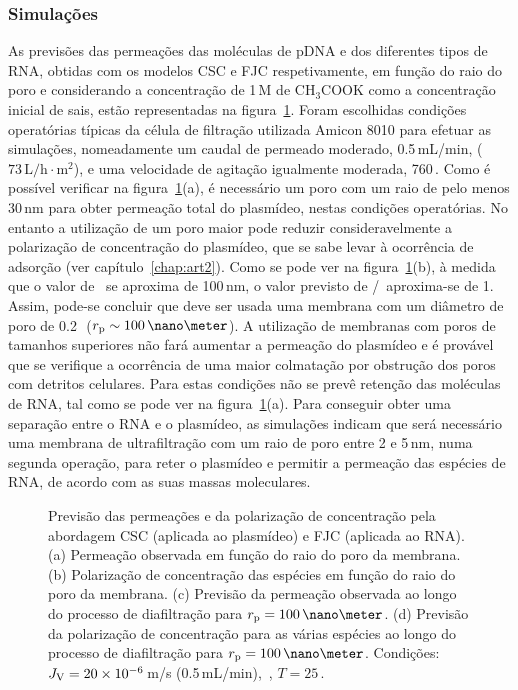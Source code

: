 \subsubsection{Simulações}
%
As previsões das permeações das moléculas de pDNA e dos diferentes tipos de RNA, obtidas com os modelos CSC e FJC respetivamente, em função do raio do poro e considerando a concentração de 1\,M de $\mathrm{CH_{3}COOK}$ como a concentração inicial de sais, estão representadas na figura~\ref{fig:1art3}. Foram escolhidas condições operatórias típicas da célula de filtração utilizada Amicon 8010 para efetuar as simulações, nomeadamente um caudal de permeado moderado, 0.5\,mL/min, ($\mathrm{73\,L/h\cdot m^{2}}$), e uma velocidade de agitação igualmente moderada, 760\,\minmum.
%
Como é possível verificar na figura~\ref{fig:1art3}(a), é necessário um poro com um raio de pelo menos 30\,nm para obter permeação total do plasmídeo, nestas condições operatórias. No entanto a utilização de um poro maior pode reduzir consideravelmente a polarização de concentração do plasmídeo, que se sabe levar à ocorrência de adsorção (ver capítulo~\ref{chap:art2}). Como se pode ver na figura~\ref{fig:1art3}(b), à medida que o valor de \raioporo\ se aproxima de 100\,nm, o valor previsto de \concm/\concb\ aproxima-se de 1. Assim, pode-se concluir que deve ser usada uma membrana com um diâmetro de poro de 0.2\,\micro\meter\ ($\raioporo\sim 100\,\nano\meter$). A utilização de membranas com poros de tamanhos superiores não fará aumentar a permeação do plasmídeo e é provável que se verifique a ocorrência de uma maior colmatação por obstrução dos poros com detritos celulares.
%
Para estas condições não se prevê retenção das moléculas de RNA, tal como se pode ver na figura~\ref{fig:1art3}(a). Para conseguir obter uma separação entre o RNA e o plasmídeo, as simulações indicam que será necessário uma membrana de ultrafiltração com um raio de poro entre 2 e 5\,nm, numa segunda operação, para reter o plasmídeo e permitir a permeação das espécies de RNA, de acordo com as suas massas moleculares. 
\begin{figure}[!t]
	\centering
	\setlength\figureheight{6cm} 
	\setlength\figurewidth{6cm}
	
	\caption[Previsão das permeações e da polarização de concentração (MF-A)]{Previsão das permeações e da polarização de concentração pela abordagem CSC (aplicada ao plasmídeo) e FJC (aplicada ao RNA). (a) Permeação observada em função do raio do poro da membrana. (b) Polarização de concentração das espécies em função do raio do poro da membrana. (c) Previsão da permeação observada ao longo do processo de diafiltração para $\raioporo=100\,\nano\meter$. (d) Previsão da polarização de concentração para as várias espécies ao longo do processo de diafiltração para $\raioporo=100\,\nano\meter$. Condições: $J_{\mathrm{V}}=20\times 10^{-6}$\,m/s (0.5\,mL/min), \,\minmum, $T=25$\,\degreecelsius.}
	\label{fig:1art3}
\end{figure}

